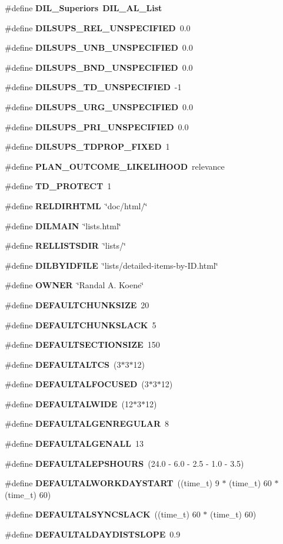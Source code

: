 \begin{CompactItemize}
\#define {\bf DIL\_\-Superiors}\ {\bf DIL\_\-AL\_\-List}
\item 
\#define {\bf DILSUPS\_\-REL\_\-UNSPECIFIED}\ 0.0
\item 
\#define {\bf DILSUPS\_\-UNB\_\-UNSPECIFIED}\ 0.0
\item 
\#define {\bf DILSUPS\_\-BND\_\-UNSPECIFIED}\ 0.0
\item 
\#define {\bf DILSUPS\_\-TD\_\-UNSPECIFIED}\ -1
\item 
\#define {\bf DILSUPS\_\-URG\_\-UNSPECIFIED}\ 0.0
\item 
\#define {\bf DILSUPS\_\-PRI\_\-UNSPECIFIED}\ 0.0
\item 
\#define {\bf DILSUPS\_\-TDPROP\_\-FIXED}\ 1
\item 
\#define {\bf PLAN\_\-OUTCOME\_\-LIKELIHOOD}\ relevance
\item 
\#define {\bf TD\_\-PROTECT}\ 1
\item 
\#define {\bf RELDIRHTML}\ \char`\"{}doc/html/\char`\"{}
\item 
\#define {\bf DILMAIN}\ \char`\"{}lists.html\char`\"{}
\item 
\#define {\bf RELLISTSDIR}\ \char`\"{}lists/\char`\"{}
\item 
\#define {\bf DILBYIDFILE}\ \char`\"{}lists/detailed-items-by-ID.html\char`\"{}
\item 
\#define {\bf OWNER}\ \char`\"{}Randal A. Koene\char`\"{}
\item 
\#define {\bf DEFAULTCHUNKSIZE}\ 20
\item 
\#define {\bf DEFAULTCHUNKSLACK}\ 5
\item 
\#define {\bf DEFAULTSECTIONSIZE}\ 150
\item 
\#define {\bf DEFAULTALTCS}\ (3$\ast$3$\ast$12)
\item 
\#define {\bf DEFAULTALFOCUSED}\ (3$\ast$3$\ast$12)
\item 
\#define {\bf DEFAULTALWIDE}\ (12$\ast$3$\ast$12)
\item 
\#define {\bf DEFAULTALGENREGULAR}\ 8
\item 
\#define {\bf DEFAULTALGENALL}\ 13
\item 
\#define {\bf DEFAULTALEPSHOURS}\ (24.0 - 6.0 - 2.5 - 1.0 - 3.5)
\item 
\#define {\bf DEFAULTALWORKDAYSTART}\ ((time\_\-t) 9 $\ast$ (time\_\-t) 60 $\ast$ (time\_\-t) 60)
\item 
\#define {\bf DEFAULTALSYNCSLACK}\ ((time\_\-t) 60 $\ast$ (time\_\-t) 60)
\item 
\#define {\bf DEFAULTALDAYDISTSLOPE}\ 0.9

\end{CompactItemize}
